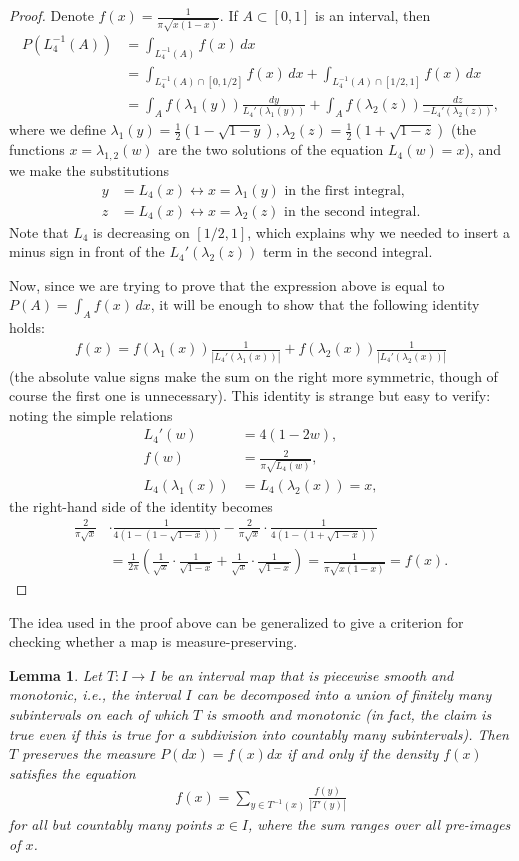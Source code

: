 \documentclass[12pt]{amsart}
\newcommand{\eqst}[1]{\begin{align*}#1\end{align*}}
\newtheorem{lem}[thm]{Lemma}
\begin{document}
\begin{proof} Denote $f(x)=\frac{1}{\pi \sqrt{x(1-x)}}$.
If $A \subset [0,1]$ is an interval, then
\eqst{
P(L_4^{-1}(A)) &= \int_{L_4^{-1}(A)} f(x)\,dx \\ &= 
\int_{L_4^{-1}(A)\cap\left[0,1/2\right]} f(x)\,dx + 
\int_{L_4^{-1}(A)\cap\left[1/2,1\right]} f(x)\,dx
\\ &= \int_A f(\lambda_1(y))\frac{dy}{L_4'(\lambda_1(y))} + \int_A f(\lambda_2(z)) \frac{dz}{-L_4'(\lambda_2(z))},
}
where we define $\lambda_1(y)=\tfrac12(1-\sqrt{1-y}), \lambda_2(z)=\tfrac12(1+\sqrt{1-z})$ (the functions $x=\lambda_{1,2}(w)$ are the two solutions of the equation $L_4(w)=x$), and we make the substitutions
\eqst{
y&=L_4(x) \leftrightarrow x=\lambda_1(y) \textrm{ in the first integral,} \\ z&=L_4(x) \leftrightarrow x=\lambda_2(z) \textrm{ in the second integral}.
}
Note that $L_4$ is decreasing on $[1/2,1]$, which explains why we needed to insert a minus sign in front of the $L_4'(\lambda_2(z))$ term in the second integral.

Now, since we are trying to prove that the expression above is equal to $P(A)=\int_A f(x)\,dx$, it will be enough to show that the following identity holds:
\eqst{
f(x) = f(\lambda_1(x))\frac{1}{|L_4'(\lambda_1(x))|} + f(\lambda_2(x))\frac{1}{|L_4'(\lambda_2(x))|}
}
(the absolute value signs make the sum on the right more symmetric, though of course the first one is unnecessary). This identity is strange but easy to verify: noting the simple relations
\eqst{
L_4'(w) &=4(1-2w), \\ f(w)&=\frac{2}{\pi\sqrt{L_4(w)}}, \\ L_4(\lambda_1(x)) &= L_4(\lambda_2(x)) =x,
}
the right-hand side of the identity becomes
\eqst{
\frac{2}{\pi \sqrt{x}} &\cdot \frac{1}{4(1-(1-\sqrt{1-x}))}
- 
\frac{2}{\pi \sqrt{x}}\cdot \frac{1}{4(1-(1+\sqrt{1-x}))}
\\ & =
\frac{1}{2\pi} \left( \frac{1}{\sqrt{x}}\cdot \frac{1}{\sqrt{1-x}} + 
\frac{1}{\sqrt{x}}\cdot \frac{1}{\sqrt{1-x}} \right) = \frac{1}{\pi\sqrt{x(1-x)}} = f(x).
}
\end{proof}

The idea used in the proof above can be generalized to give a criterion for checking whether a map is measure-preserving.

\begin{lem} \label{lem:measure-pres}
Let $T:I\to I$ be an interval map that is piecewise smooth and monotonic, i.e., the interval $I$ can be decomposed into a union of finitely many subintervals on each of which $T$ is smooth and monotonic (in fact, the claim is true even if this is true for a subdivision into countably many subintervals). Then $T$ preserves the measure $P(dx)=f(x)dx$ if and only if the density $f(x)$ satisfies the equation
\eqst{
f(x) = \sum_{y\in T^{-1}(x)} \frac{f(y)}{|T'(y)|}
}
for all but countably many points $x\in I$, where the sum ranges over all pre-images of $x$.
\end{lem}
\end{document}
